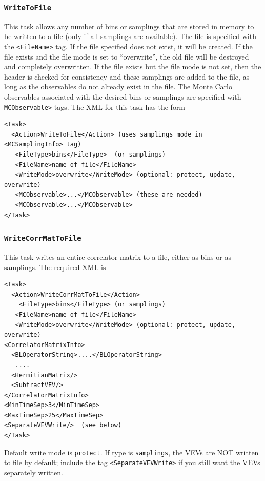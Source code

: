 \documentclass[12pt]{article}
\newcommand{\vb}{\texttt}
\begin{document}
\subsubsection{\vb{WriteToFile}}
This task allows any number of bins or samplings that are stored in memory to be written
to a file (only if all samplings are available).
The file is specified with the \vb{<FileName>} tag.
If the file specified does not exist, it will be created. If the file
exists and the file mode is set to ``overwrite'', the old file will be destroyed
and completely overwritten.  If the file exists but the file mode is not set,
then the header is checked for consistency and these
samplings are added to the file, as long as the observables do
not already exist in the file.
The Monte Carlo observables associated with the desired bins or samplings are
specified with \vb{MCObservable>} tags.
The XML for this task has the form
\begin{verbatim}
<Task>
  <Action>WriteToFile</Action> (uses samplings mode in <MCSamplingInfo> tag)
   <FileType>bins</FileType>  (or samplings)
   <FileName>name_of_file</FileName>
   <WriteMode>overwrite</WriteMode> (optional: protect, update, overwrite) 
   <MCObservable>...</MCObservable> (these are needed)
   <MCObservable>...</MCObservable>
</Task>
\end{verbatim}

\subsubsection{\vb{WriteCorrMatToFile}}
This task writes an entire correlator matrix to a file, either as bins or
as samplings.  The required XML is
\begin{verbatim}
<Task>
  <Action>WriteCorrMatToFile</Action>
    <FileType>bins</FileType> (or samplings)
   <FileName>name_of_file</FileName>
   <WriteMode>overwrite</WriteMode> (optional: protect, update, overwrite) 
<CorrelatorMatrixInfo>
  <BLOperatorString>....</BLOperatorString>
   ....
  <HermitianMatrix/>
  <SubtractVEV/>
</CorrelatorMatrixInfo>
<MinTimeSep>3</MinTimeSep>
<MaxTimeSep>25</MaxTimeSep>
<SeparateVEVWrite/>  (see below)
</Task>            
\end{verbatim}
Default write mode is \vb{protect}.  If type is \vb{samplings}, the VEVs are 
NOT written to file by default; include the tag \vb{<SeparateVEVWrite>} if you 
still want the VEVs separately written.
\end{document}
